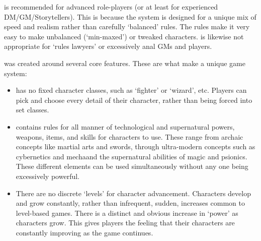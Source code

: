 \documentclass[twoside]{book}
\begin{document}
    {  
    \APATHY{}  is recommended for advanced role-players (or
            at least for experienced DM/GM/Storytellers). This is because
            the \APATHY{}  system is designed for a unique mix of speed
            and realism rather than carefully `balanced'
            rules. The \APATHY{}  rules make it very easy to make
            unbalanced (`min-maxed') or tweaked characters.
            \APATHY{}  is likewise not appropriate for `rules
            lawyers' or excessively anal GMs and players.
          
    }
  
    {  
    \APATHY{}  was created around several core features.
            These are what make \APATHY{}  a unique game system:
          
    }
  
\begin{itemize}
      
  \item   
               
    {  
    \APATHY{}  has no fixed character classes, such as
                `fighter' or `wizard', etc.
                Players can pick and choose every detail of their
                character, rather than being forced into set classes.
              
    }
    
            
  \item   
               
    {  
    \APATHY{}  contains rules for all manner of
                technological and supernatural powers, weapons, items,
                and skills for characters to use. These range from
                archaic concepts like martial arts and swords, through
                ultra-modern concepts such as cybernetics and
                mechaand the supernatural abilities of magic and
                psionics. These different elements can be used
                simultaneously without any one being excessively
                powerful.
              
    }
    
            
  \item   
                
    {  
    There are no discrete `levels' for
                 character advancement. Characters develop and grow
                 constantly, rather than infrequent, sudden, increases
                 common to level-based games. There is a distinct and
                 obvious increase in `power' as characters
                 grow. This gives players the feeling that their
                 characters are constantly improving as the game
                 continues. 
    }
  

\end{itemize}
\end{document}
